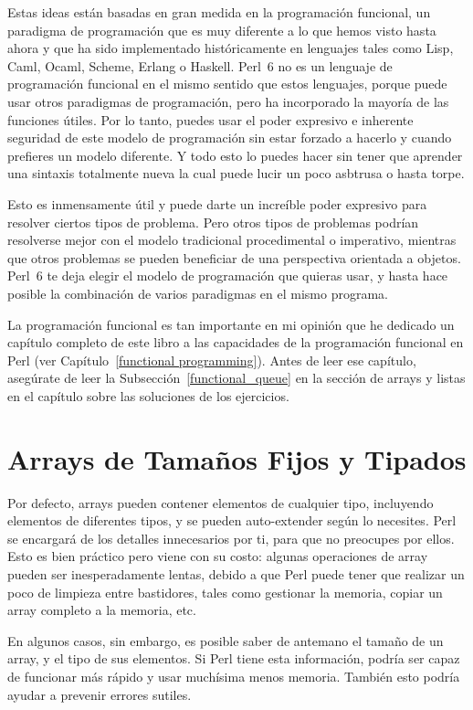 Estas ideas están basadas en gran medida en la programación
funcional, un paradigma de programación que es muy diferente
a lo que hemos visto hasta ahora y que ha sido implementado
históricamente en lenguajes tales como Lisp, Caml, Ocaml,
Scheme, Erlang o Haskell. Perl~6 no es un lenguaje de 
programación funcional en el mismo sentido que estos lenguajes,
porque puede usar otros paradigmas de programación, pero 
ha incorporado la mayoría de las funciones útiles. Por lo tanto,
puedes usar el poder expresivo e inherente seguridad de este 
modelo de programación sin estar forzado a hacerlo y
cuando prefieres un modelo diferente. Y todo esto lo 
puedes hacer sin tener que aprender una sintaxis
totalmente nueva la cual puede lucir un poco asbtrusa 
o hasta torpe.

Esto es inmensamente útil y puede darte un increíble poder
expresivo para resolver ciertos tipos de problema.
Pero otros tipos de problemas podrían resolverse mejor
con el modelo tradicional procedimental o imperativo,
mientras que otros problemas se pueden beneficiar 
de una perspectiva orientada a objetos. Perl~6 te deja
elegir el modelo de programación que quieras usar, y hasta hace 
posible la combinación de varios paradigmas en el mismo
programa.

La programación funcional es tan importante en mi opinión
que he dedicado un capítulo completo de este libro a las
capacidades de la programación funcional en Perl 
(ver Capítulo~\ref{functional programming}). Antes de leer
ese capítulo, asegúrate de leer la Subsección~\ref{functional_queue}
en la sección de arrays y listas en el capítulo sobre las
soluciones de los ejercicios.

\section{Arrays de Tamaños Fijos y Tipados}

Por defecto, arrays pueden contener elementos de cualquier
tipo, incluyendo elementos de diferentes tipos, y se pueden
auto-extender según lo necesites. Perl se encargará de 
los detalles innecesarios por ti, para que no preocupes
por ellos. Esto es bien práctico pero viene con su costo:
algunas operaciones de array pueden ser inesperadamente lentas,
debido a que Perl puede tener que realizar un poco de limpieza
entre bastidores, tales como gestionar la memoria, copiar un array 
completo a la memoria, etc.  

En algunos casos, sin embargo, es posible saber de antemano
el tamaño de un array, y el tipo de sus elementos. Si Perl
tiene esta información, podría ser capaz de funcionar más
rápido y usar muchísima menos memoria. También esto podría 
ayudar a prevenir errores sutiles.

